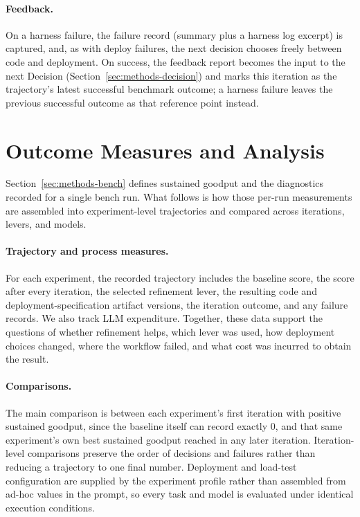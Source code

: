 \paragraph{Feedback.}
\label{sec:methods-outcome}
On a harness failure, the failure record (summary plus a harness log
excerpt) is captured, and, as with deploy failures, the next decision
chooses freely between code and deployment. On success, the feedback report
becomes the input to the next Decision (Section~\ref{sec:methods-decision})
and marks this iteration as the trajectory's latest successful benchmark
outcome; a harness failure leaves the previous successful outcome as that
reference point instead.



\newpage
\section{Outcome Measures and Analysis}
\label{sec:methods-metrics}

Section~\ref{sec:methods-bench} defines sustained goodput and the
diagnostics recorded for a single bench run. What follows is how those
per-run measurements are assembled into experiment-level trajectories and
compared across iterations, levers, and models.

\paragraph{Trajectory and process measures.}
For each experiment, the recorded trajectory includes the baseline score,
the score after every iteration, the selected refinement lever, the
resulting code and deployment-specification artifact versions, the
iteration outcome, and any failure records. We also track LLM expenditure.
Together, these data support the questions of whether refinement helps,
which lever was used, how deployment choices changed, where the workflow
failed, and what cost was incurred to obtain the result.

\paragraph{Comparisons.}
The main comparison is between each experiment's first iteration with
positive sustained goodput, since the baseline itself can record exactly
$0$, and that same experiment's own best sustained goodput reached in any
later iteration. Iteration-level comparisons preserve the order of
decisions and failures rather than reducing a trajectory to one final
number. Deployment and load-test configuration are supplied by the
experiment profile rather than assembled from ad-hoc values in the prompt,
so every task and model is evaluated under identical execution conditions.

